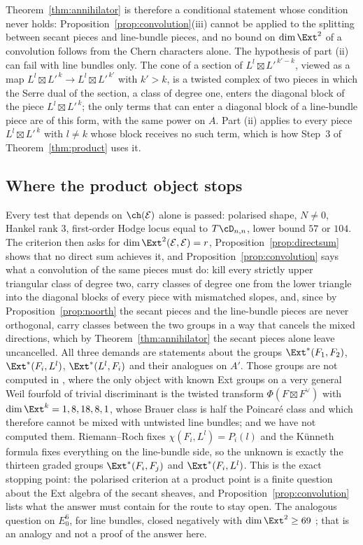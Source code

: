 Theorem~\ref{thm:annihilator} is therefore a conditional statement whose condition never holds: Proposition~\ref{prop:convolution}(iii) cannot be applied to the splitting between secant pieces and line-bundle pieces, and no bound on $\dim\Ext^{2}$ of a convolution follows from the Chern characters alone. The hypothesis of part (ii) can fail with line bundles only. The cone of a section of $L^{l}\boxtimes L'^{\,k'-k}$, viewed as a map $L^{l}\boxtimes L'^{\,k}\to L^{l}\boxtimes L'^{\,k'}$ with $k'>k$, is a twisted complex of two pieces in which the Serre dual of the section, a class of degree one, enters the diagonal block of the piece $L^{l}\boxtimes L'^{\,k}$; the only terms that can enter a diagonal block of a line-bundle piece are of this form, with the same power on $A$. Part (ii) applies to every piece $L^{l}\boxtimes L'^{\,k}$ with $l\ne k$ whose block receives no such term, which is how Step~3 of Theorem~\ref{thm:product} uses it.

\subsection{Where the product object stops}\label{ssec:f2stop1}

Every test that depends on $\ch(\mathcal{E})$ alone is passed: polarised shape, $N\ne0$, Hankel rank $3$, first-order Hodge locus equal to $T\cD_{n,n}$, lower bound $57$ or $104$. The criterion then asks for $\dim\Ext^{2}(\mathcal{E},\mathcal{E})=r$, Proposition~\ref{prop:directsum} shows that no direct sum achieves it, and Proposition~\ref{prop:convolution} says what a convolution of the same pieces must do: kill every strictly upper triangular class of degree two, carry classes of degree one from the lower triangle into the diagonal blocks of every piece with mismatched slopes, and, since by Proposition~\ref{prop:noorth} the secant pieces and the line-bundle pieces are never orthogonal, carry classes between the two groups in a way that cancels the mixed directions, which by Theorem~\ref{thm:annihilator} the secant pieces alone leave uncancelled. All three demands are statements about the groups $\Ext^{*}(F_{1},F_{2})$, $\Ext^{*}(F_{i},L^{l})$, $\Ext^{*}(L^{l},F_{i})$ and their analogues on $A'$. Those groups are not computed in \cite{Mar25a,Mar25b,Mar25c}, where the only object with known Ext groups on a very general Weil fourfold of trivial discriminant is the twisted transform $\Phi(F\boxtimes F^{\vee})$ with $\dim\Ext^{k}=1,8,18,8,1$, whose Brauer class is half the Poincar\'e class and which therefore cannot be mixed with untwisted line bundles; and we have not computed them. Riemann--Roch fixes $\chi(F_{i},L^{l})=P_{i}(l)$ and the K\"unneth formula fixes everything on the line-bundle side, so the unknown is exactly the thirteen graded groups $\Ext^{*}(F_{i},F_{j})$ and $\Ext^{*}(F_{i},L^{l})$. This is the exact stopping point: the polarised criterion at a product point is a finite question about the Ext algebra of the secant sheaves, and Proposition~\ref{prop:convolution} lists what the answer must contain for the route to stay open. The analogous question on $E_{0}^{6}$, for line bundles, closed negatively with $\dim\Ext^{2}\ge69$ \cite[Thm.~18.35]{BMB26}; that is an analogy and not a proof of the answer here.

